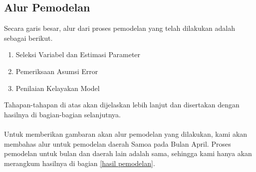\begin{enumerate}
\subsection{Alur Pemodelan}
Secara garis besar, alur dari proses pemodelan yang telah dilakukan adalah sebagai berikut.
\begin{enumerate}
    \item Seleksi Variabel dan Estimasi Parameter
    \item Pemeriksaan Asumsi Error
    \item Penilaian Kelayakan Model
\end{enumerate}
Tahapan-tahapan di atas akan dijelaskan lebih lanjut dan disertakan dengan hasilnya di bagian-bagian selanjutnya.
\\~\\
Untuk memberikan gambaran akan alur pemodelan yang dilakukan, kami akan membahas alur untuk pemodelan daerah Samoa pada Bulan April. Proses pemodelan untuk bulan dan daerah lain adalah sama, sehingga kami hanya akan merangkum hasilnya di bagian \ref{hasil pemodelan}.

\end{enumerate}
